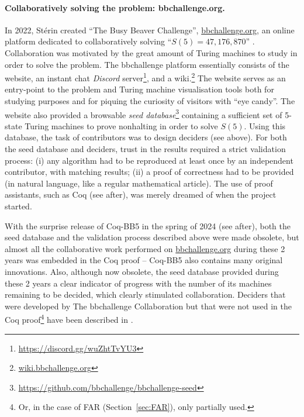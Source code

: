 \documentclass[a4paper,british]{article}
\theoremstyle{definition} %
\numberwithin{equation}{section}
\theoremstyle{definition} %
\newcommand{\BBtheFifth}{47{,}176{,}870}
\newcommand{\CoqBB}{Coq-BB5\xspace}
\begin{document}
\paragraph{Collaboratively solving the problem: bbchallenge.org.} In 2022, Stérin created ``The Busy Beaver Challenge'', \url{bbchallenge.org}, an online platform dedicated to collaboratively solving ``$S(5)=\BBtheFifth$'' \cite{sterin_2022_14955828}. Collaboration was motivated by the great amount of Turing machines to study in order to solve the problem. The bbchallenge platform essentially consists of the website, an instant chat \textit{Discord} server\footnote{\url{https://discord.gg/wuZhtTvYU3}}, and a wiki.\footnote{\url{wiki.bbchallenge.org}} The website serves as an entry-point to the problem and Turing machine visualisation tools both for studying purposes and for piquing the curiosity of visitors with ``eye candy''. The website also provided a browsable \textit{seed database}\footnote{\url{https://github.com/bbchallenge/bbchallenge-seed}} containing a sufficient set of 5-state Turing machines to prove nonhalting in order to solve $S(5)$. Using this database, the task of contributors was to design deciders (see above). For both the seed database and deciders, trust in the results required a strict validation process: (i) any algorithm had to be reproduced at least once by an independent contributor, with matching results; (ii) a proof of correctness had to be provided (in natural language, like a regular mathematical article). The use of proof assistants, such as Coq (see after), was merely dreamed of when the project started.


With the surprise release of \CoqBB in the spring of 2024 (see after), both the seed database and the validation process described above were made obsolete, but almost all the collaborative work performed on \url{bbchallenge.org} during these 2 years was embedded in the Coq proof -- \CoqBB also contains many original innovations. Also, although now obsolete, the seed database provided during these 2 years a clear indicator of progress with the number of its machines remaining to be decided, which clearly stimulated collaboration. Deciders that were developed by The bbchallenge Collaboration but that were not used in the Coq proof\footnote{Or, in the case of FAR (Section~\ref{sec:FAR}), only partially used.} have been described in \cite{bbchallenge_part1}.
\end{document}
